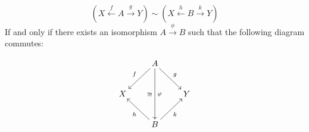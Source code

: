 \documentclass[12pt]{ociamthesis}  %
\begin{document}
$$
(X\xleftarrow{f} A \xrightarrow{g} Y)
 \sim
(X\xleftarrow{h} B \xrightarrow{k} Y)
$$
If and only if there exists an isomorphism $A\xrightarrow{\phi} B$ such that the following diagram commutes:

$$
\xymatrix{
    & A \ar[dl]_{f} \ar[dr]^{g} \ar[dd]^{\phi}_{\cong}
    &
  \\X 
    &
    & Y
  \\
    & B \ar[ul]^{h} \ar[ur]_{k}
    &
}
$$



























%
%
%
\end{document}
